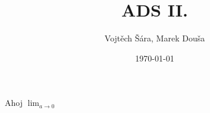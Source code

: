 \documentclass{article}
\title{ADS II.}
\date{\today}
\author{Vojtěch Šára, Marek Douša}
\begin{document}
\maketitle
Ahoj $\lim_{a \rightarrow 0}$ \\
\end{document}
